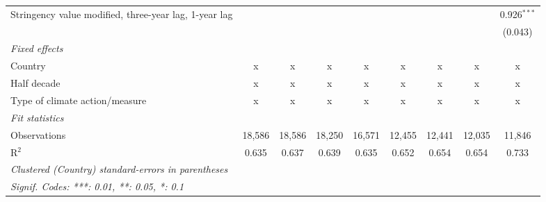 \begin{table}[htbp]
\begin{tabular}{lcccccccc}
      Stringency value modified, three-year lag, 1-year lag                    &               &               &                &              &               &               &               & 0.926$^{***}$\\   
                                                                               &               &               &                &              &               &               &               & (0.043)\\   
      \emph{Fixed effects}\\
      Country                                                                  & x             & x             & x              & x            & x             & x             & x             & x\\  
      Half decade                                                              & x             & x             & x              & x            & x             & x             & x             & x\\  
      Type of climate action/measure                                           & x             & x             & x              & x            & x             & x             & x             & x\\  
      \midrule \emph{Fit statistics}\\
      Observations                                                             & 18,586        & 18,586        & 18,250         & 16,571       & 12,455        & 12,441        & 12,035        & 11,846\\  
      R$^2$                                                                    & 0.635         & 0.637         & 0.639          & 0.635        & 0.652         & 0.654         & 0.654         & 0.733\\  
      \midrule
      \multicolumn{9}{l}{\emph{Clustered (Country) standard-errors in parentheses}}\\
      \multicolumn{9}{l}{\emph{Signif. Codes: ***: 0.01, **: 0.05, *: 0.1}}\\
   \end{tabular}
\end{table}


